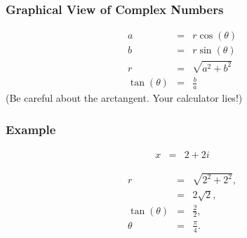 \begin{frame}
  \frametitle{Graphical View of Complex Numbers}

  
  \begin{eqnarray*}
    a & = & r\cos(\theta) \\
    b & = & r\sin(\theta) \\
    r & = & \sqrt{a^2+b^2} \\
    \tan(\theta) & = & \frac{b}{a}
  \end{eqnarray*}
  (Be careful about the arctangent. Your calculator lies!)

\end{frame}


\begin{frame}
  \frametitle{Example}

  \begin{eqnarray*}
    x & = &  2 + 2i
  \end{eqnarray*}

  {%

    \begin{eqnarray*}
      r & = & \sqrt{2^2+2^2}, \\
        & = & 2\sqrt{2}, \\
      \tan(\theta) & = & \frac{2}{2}, \\
      \theta       & = & \frac{\pi}{4}.
    \end{eqnarray*}

  }

\end{frame}


